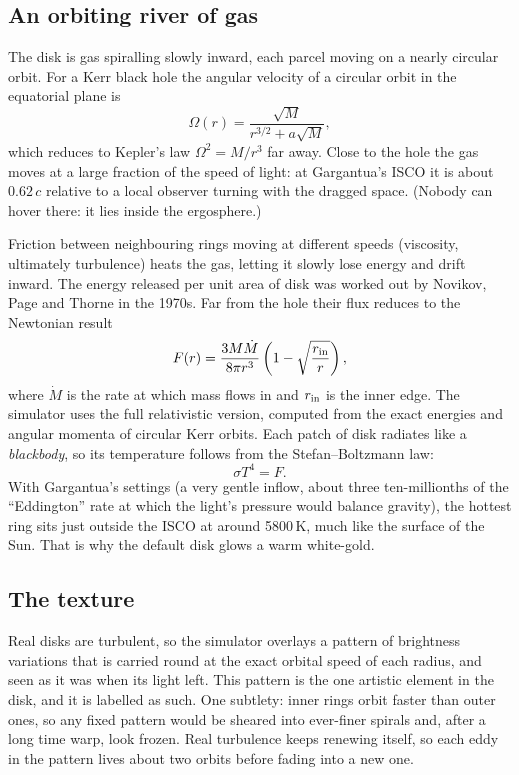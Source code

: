 \documentclass[11pt,a4paper]{article}
\begin{document}
\subsection{An orbiting river of gas}

The disk is gas spiralling slowly inward, each parcel moving on a nearly circular orbit.
For a Kerr black hole the angular velocity of a circular orbit in the equatorial plane is
\begin{equation}
  \Omega(r) = \frac{\sqrt M}{r^{3/2} + a\sqrt M},
\end{equation}
which reduces to Kepler's law $\Omega^2 = M/r^3$ far away. Close to the hole the gas moves
at a large fraction of the speed of light: at Gargantua's ISCO it is about $0.62\,c$
relative to a local observer turning with the dragged space. (Nobody can hover there: it
lies inside the ergosphere.)

Friction between neighbouring rings moving at different speeds (viscosity, ultimately
turbulence) heats the gas, letting it slowly lose energy and drift inward. The energy
released per unit area of disk was worked out by Novikov, Page and Thorne in the 1970s.
Far from the hole their flux reduces to the Newtonian result
\begin{equation}
  F(r) = \frac{3 M \dot M}{8\pi r^3}\left(1 - \sqrt{\frac{r_{\rm in}}{r}}\right),
\end{equation}
where $\dot M$ is the rate at which mass flows in and $r_{\rm in}$ is the inner edge. The
simulator uses the full relativistic version, computed from the exact energies and angular
momenta of circular Kerr orbits. Each patch of disk radiates like a \emph{blackbody}, so its
temperature follows from the Stefan--Boltzmann law:
\begin{equation}
  \sigma T^4 = F .
\end{equation}
With Gargantua's settings (a very gentle inflow, about three ten-millionths of the
``Eddington'' rate at which the light's pressure would balance gravity), the hottest ring sits just outside the ISCO at around 5800\,K, much
like the surface of the Sun. That is why the default disk glows a warm white-gold.

\subsection{The texture}

Real disks are turbulent, so the simulator overlays a pattern of brightness variations
that is carried round at the exact orbital speed of each radius, and seen as it was when
its light left. This pattern is the one artistic element in the disk, and it is labelled
as such. One subtlety: inner rings orbit faster than outer ones, so any fixed pattern
would be sheared into ever-finer spirals and, after a long time warp, look frozen. Real
turbulence keeps renewing itself, so each eddy in the pattern lives about two orbits
before fading into a new one.
\end{document}
